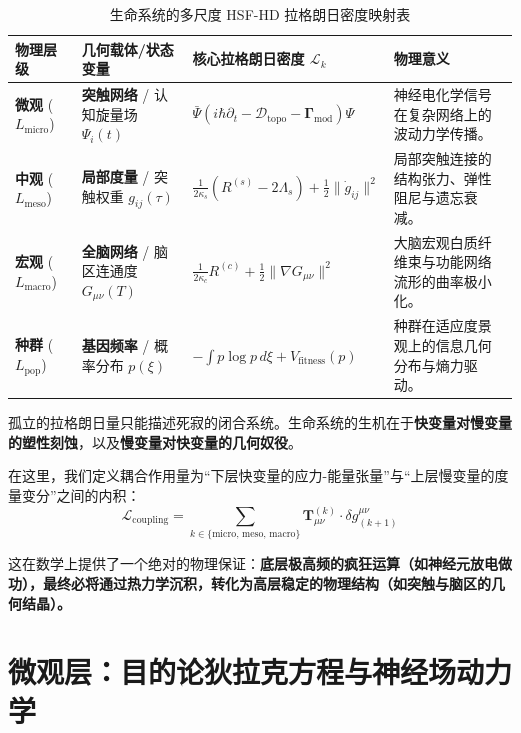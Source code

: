 \begin{table}[htbp]
\centering
\renewcommand{\arraystretch}{1.5}
\begin{tabularx}{\textwidth}{l|l|X|X}
\toprule
\rowcolor{structurecolor!20} \textbf{物理层级} & \textbf{几何载体/状态变量} & \textbf{核心拉格朗日密度 $\mathcal{L}_k$} & \textbf{物理意义} \\
\midrule
\textbf{微观} ($L_{\text{micro}}$) & \textbf{突触网络} / 认知旋量场 $\Psi_i(t)$ & $\bar{\Psi} \left( i\hbar \partial_t - \mathcal{D}_{\text{topo}} - \mathbf{\Gamma}_{\text{mod}} \right) \Psi$ & 神经电化学信号在复杂网络上的波动力学传播。 \\
\hline
\textbf{中观} ($L_{\text{meso}}$) & \textbf{局部度量} / 突触权重 $g_{ij}(\tau)$ & $\frac{1}{2\kappa_s}(R^{(s)} - 2\Lambda_s) + \frac{1}{2} \|\dot{g}_{ij}\|^2$ & 局部突触连接的结构张力、弹性阻尼与遗忘衰减。 \\
\hline
\textbf{宏观} ($L_{\text{macro}}$) & \textbf{全脑网络} / 脑区连通度 $G_{\mu\nu}(T)$ & $\frac{1}{2\kappa_c} R^{(c)} + \frac{1}{2} \|\nabla G_{\mu\nu}\|^2$ & 大脑宏观白质纤维束与功能网络流形的曲率极小化。 \\
\hline
\textbf{种群} ($L_{\text{pop}}$) & \textbf{基因频率} / 概率分布 $p(\xi)$ & $- \int p \log p \, d\xi + V_{\text{fitness}}(p)$ & 种群在适应度景观上的信息几何分布与熵力驱动。 \\
\bottomrule
\end{tabularx}
\caption{生命系统的多尺度 HSF-HD 拉格朗日密度映射表}
\label{tab:life_lagrangian_scales}
\end{table}


孤立的拉格朗日量只能描述死寂的闭合系统。生命系统的生机在于\textbf{快变量对慢变量的塑性刻蚀}，以及\textbf{慢变量对快变量的几何奴役}。

在这里，我们定义耦合作用量为“下层快变量的应力-能量张量”与“上层慢变量的度量变分”之间的内积：
\begin{equation}
    \mathcal{L}_{\text{coupling}} = \sum_{k \in \{\text{micro, meso, macro}\}} \mathbf{T}_{\mu\nu}^{(k)} \cdot \delta g^{\mu\nu}_{(k+1)}
\end{equation}

这在数学上提供了一个绝对的物理保证：\textbf{底层极高频的疯狂运算（如神经元放电做功），最终必将通过热力学沉积，转化为高层稳定的物理结构（如突触与脑区的几何结晶）。}

\section{微观层：目的论狄拉克方程与神经场动力学}
\label{sec:micro_neural_field_dynamics}

